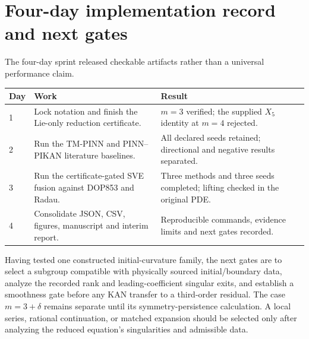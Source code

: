 \documentclass[11pt]{article}
\begin{document}
\section{Four-day implementation record and next gates}
The four-day sprint released checkable artifacts rather than a universal
performance claim.
\begin{center}
\small
\begin{tabularx}{\linewidth}{@{}lXX@{}}
\toprule
Day & Work & Result \\
\midrule
1 & Lock notation and finish the Lie-only reduction certificate. &
$m=3$ verified; the supplied $X_5$ identity at $m=4$ rejected. \\
2 & Run the TM-PINN and PINN--PIKAN literature baselines. &
All declared seeds retained; directional and negative results separated. \\
3 & Run the certificate-gated SVE fusion against DOP853 and Radau. &
Three methods and three seeds completed; lifting checked in the original PDE. \\
4 & Consolidate JSON, CSV, figures, manuscript and interim report. &
Reproducible commands, evidence limits and next gates recorded. \\
\bottomrule
\end{tabularx}
\end{center}
Having tested one constructed initial-curvature family, the next gates are to
select a subgroup compatible with physically sourced initial/boundary data,
analyze the recorded rank and leading-coefficient singular exits, and establish
a smoothness gate before any KAN transfer to a third-order residual. The case
$m=3+\delta$ remains separate until its symmetry-persistence calculation. A
local series, rational continuation, or matched expansion should be selected
only after analyzing the reduced equation's singularities and admissible data.
\end{document}
